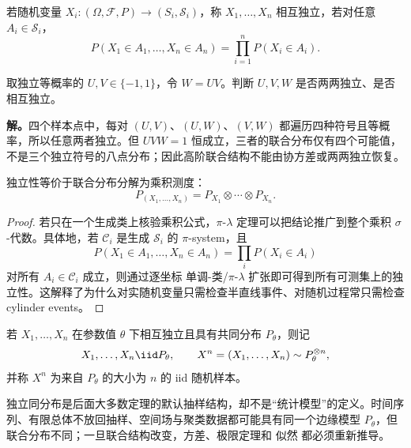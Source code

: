 \begin{definition}[相互独立]
若随机变量 $X_i:(\Omega,\mathcal F,P)\to(S_i,\mathcal S_i)$，称 $X_1,\ldots,X_n$ 相互独立，若对任意 $A_i\in\mathcal S_i$，
\begin{equation*}P(X_1\in A_1,\ldots,X_n\in A_n)
=\prod_{i=1}^nP(X_i\in A_i).\end{equation*}
\end{definition}
\begin{workedexample}[两两独立仍不能代替相互独立]
取独立等概率的 $U,V\in\{-1,1\}$，令 $W=UV$。判断 $U,V,W$ 是否两两独立、是否相互独立。

\textbf{解。}四个样本点中，每对 $(U,V)$、$(U,W)$、$(V,W)$ 都遍历四种符号且等概率，所以任意两者独立。但 $UVW=1$ 恒成立，三者的联合分布仅有四个可能值，不是三个独立符号的八点分布；因此高阶联合结构不能由协方差或两两独立恢复。

\end{workedexample}
\begin{proposition}[独立性的乘积测度判据]
独立性等价于联合分布分解为乘积测度：
\begin{equation*}P_{(X_1,\ldots,X_n)}
=P_{X_1}\otimes\cdots\otimes P_{X_n}.\end{equation*}
\end{proposition}
\begin{proof}
若只在一个生成类上核验乘积公式，$\pi$-$\lambda$ 定理可以把结论推广到整个乘积 $\sigma$-代数。具体地，若 $\mathcal C_i$ 是生成 $\mathcal S_i$ 的 $\pi$-system，且
\[
P(X_1\in A_1,\ldots,X_n\in A_n)
=\prod_iP(X_i\in A_i)
\]
对所有 $A_i\in\mathcal C_i$ 成立，则通过逐坐标 单调-类/$\pi$-$\lambda$ 扩张即可得到所有可测集上的独立性。这解释了为什么对实随机变量只需检查半直线事件、对随机过程常只需检查 cylinder events。

\end{proof}

\begin{definition}[随机样本]
若 $X_1,\ldots,X_n$ 在参数值 $\theta$ 下相互独立且具有共同分布 $P_\theta$，则记
\begin{equation}\label{eq:math-stat-iid-sample}
 X_1,\ldots,X_n\iid P_\theta,
 \qquad
 X^n=(X_1,\ldots,X_n)\sim P_\theta^{\otimes n},
\end{equation}
并称 $X^n$ 为来自 $P_\theta$ 的大小为 $n$ 的 iid 随机样本。
\end{definition}

独立同分布是后面大多数定理的默认抽样结构，却不是“统计模型”的定义。时间序列、有限总体不放回抽样、空间场与聚类数据都可能具有同一个边缘模型 $P_\theta$，但联合分布不同；一旦联合结构改变，方差、极限定理和 似然 都必须重新推导。

